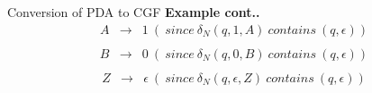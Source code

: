 \documentclass{beamer}
\begin{document}
\begin{frame}{Conversion of PDA to CGF}
	\textbf{Example cont..}\\
\begin{eqnarray*}
	A &\rightarrow& 1\  (\ since\  \delta_N (q, 1, A) \ contains\  (q, \epsilon))\\
\end{eqnarray*}
\begin{eqnarray*}
	B &\rightarrow& 0\  (\ since\  \delta_N (q, 0, B) \ contains\  (q, \epsilon)) \\
\end{eqnarray*}
\begin{eqnarray*}
	Z &\rightarrow& \epsilon\  (\ since\  \delta_N (q, \epsilon, Z) \ contains\  (q, \epsilon))\\
\end{eqnarray*}
\end{frame}
\end{document}
